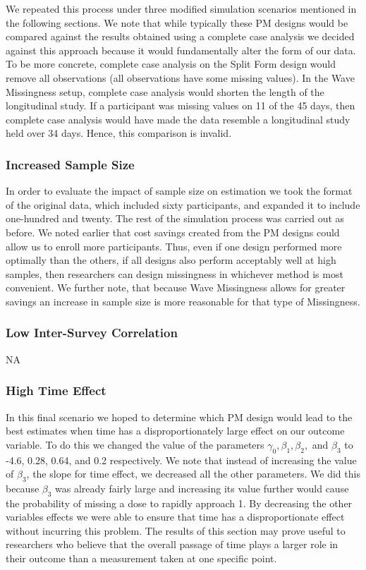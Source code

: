 \documentclass{svjour3}                     %
\begin{document}
We repeated this process under three modified simulation scenarios mentioned in the following sections. We note that while typically these PM designs would be compared against the results obtained using a complete case analysis \citep{rhemtulla2016asymptotic} we decided against this approach because it would fundamentally alter the form of our data. To be more concrete, complete case analysis on the Split Form design would remove all observations (all observations have some missing values). In the Wave Missingness setup, complete case analysis would shorten the length of the longitudinal study. If a participant was missing values on 11 of the 45 days, then complete case analysis would have made the data resemble a longitudinal study held over 34 days. Hence, this comparison is invalid. \par

\subsubsection{Increased Sample Size}
In order to evaluate the impact of sample size on estimation we took the format of the original data, which included sixty participants, and expanded it to include one-hundred and twenty. The rest of the simulation process was carried out as before. We noted earlier that cost savings created from the PM designs could allow us to enroll more participants. Thus, even if one design performed more optimally than the others, if all designs also perform acceptably well at high samples, then researchers can design missingness in whichever method is most convenient. We further note, that because Wave Missingness allows for greater savings an increase in sample size is more reasonable for that type of Missingness. \par
\subsubsection{Low Inter-Survey Correlation}
NA
\subsubsection{High Time Effect}
In this final scenario we hoped to determine which PM design would lead to the best estimates when time has a disproportionately large effect on our outcome variable. To do this we changed the value of the parameters $\gamma_0, \beta_1, \beta_2,$ and $\beta_3$ to -4.6, 0.28, 0.64, and 0.2 respectively. We note that instead of increasing the value of $\beta_3$, the slope for time effect, we decreased all the other parameters. We did this because $\beta_3$ was already fairly large and increasing its value further would cause the probability of missing a dose to rapidly approach 1. By decreasing the other variables effects we were able to ensure that time has a disproportionate effect without incurring this problem. The results of this section may prove useful to researchers who believe that the overall passage of time plays a larger role in their outcome than a measurement taken at one specific point. \par
\end{document}
